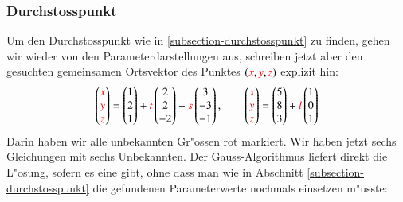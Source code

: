 \subsubsection{Durchstosspunkt}
Um den Durchstosspunkt wie in \ref{subsection-durchstosspunkt} zu finden,
gehen wir wieder von den Parameterdarstellungen aus, schreiben jetzt
aber den gesuchten gemeinsamen Ortsvektor des Punktes
$({\color{red}x}, {\color{red}y}, {\color{red}z})$ explizit hin:
\[
\begin{pmatrix}
\color{red}x\\
\color{red}y\\
\color{red}z\\
\end{pmatrix}
=
\begin{pmatrix}1\\2\\1 \end{pmatrix}
+
{\color{red}t}\begin{pmatrix}2\\2\\-2\end{pmatrix}
+
{\color{red}s}\begin{pmatrix}3\\-3\\-1\end{pmatrix}
,\qquad
\begin{pmatrix}
\color{red}x\\
\color{red}y\\
\color{red}z\\
\end{pmatrix}
=
\begin{pmatrix} 5\\8\\3 \end{pmatrix}
+
{\color{red}l}\begin{pmatrix} 1\\0\\1 \end{pmatrix}
\]
Darin haben wir alle unbekannten Gr"ossen {\color{red}rot} markiert.
Wir haben jetzt sechs Gleichungen mit sechs Unbekannten.
Der Gauss-Algorithmus liefert direkt die L"osung, sofern es eine gibt,
ohne dass man wie in Abschnitt \ref{subsection-durchstosspunkt}
die gefundenen Parameterwerte nochmals einsetzen m"usste:

